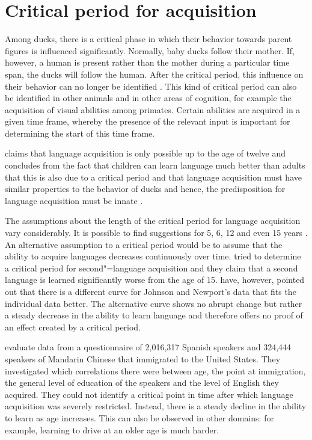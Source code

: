 \section{Critical period for acquisition}

Among ducks, there is a critical phase in which their
behavior towards parent figures is influenced significantly. Normally,
baby ducks follow their mother. If, however, a human is present rather than the mother during a particular time span, the ducks will follow the human.
After the critical period, this influence on their behavior can no longer be identified \citep{Lorenz70a-u}. This kind of critical period can also be identified
in other animals and in other areas of cognition, for example the acquisition of visual abilities among primates.
Certain abilities are acquired in a given time frame, whereby the presence of the relevant input is important for determining the start of this
time frame.

\citet{Lenneberg64a} claims that language acquisition is only possible up to the age of twelve and concludes from the fact that children can learn
language much better than adults that this is also due to a critical period and that language acquisition must have similar properties to
the behavior of ducks and hence, the predisposition for language acquisition must be innate \citep[Chapter~4]{Lenneberg67a-u}.

\addlines
The assumptions about the length of the critical period for language acquisition vary considerably. It is possible to find suggestions for 5, 6, 12 and even 15 years
\citep[]{HBW2003a}. An alternative assumption to a critical period would be to assume that the ability to acquire languages decreases continuously
over time. 
\citet{JN89a} tried to determine a critical period for second"=language acquisition and they claim that a second language is learned
significantly worse from the age of 15.\nocite{Sorace2003a}
\citet*[\page]{EBJKSPP96a} have, however, pointed out that there is a different curve for Johnson and Newport's data that fits the individual data better. The alternative curve
shows no abrupt change but rather a steady decrease in the ability to learn language and therefore offers no proof of an effect created by a critical period.

\citet*{HBW2003a} evaluate data from a questionnaire of 2,016,317 Spanish speakers and 324,444 speakers of Mandarin Chinese
that immigrated to the United States. They investigated which correlations there were between age, the point at immigration, the general level of education of the speakers
and the level of English they acquired.
They could not identify a critical point in time after which language acquisition was severely restricted.
Instead, there is a steady decline in the ability to learn as age increases. This can also be observed in other
domains: for example, learning to drive at an older age is much harder.

